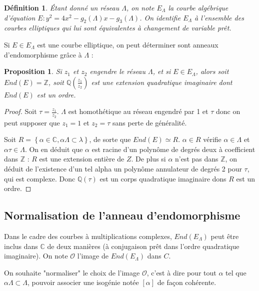 \documentclass{article}
\newcommand{\Z}[0]{\mathbb{Z}}
\newcommand{\Q}[0]{\mathbb{Q}}
\newcommand{\C}[0]{\mathbb{C}}
\newcommand{\OR}[0]{\mathcal{O}}
\newtheorem{Prop}[The]{Proposition}
\newtheorem{Def}[The]{Définition}
\begin{document}
\begin{Def}
	Étant donné un réseau $\Lambda$, on note $E_{\Lambda}$ la courbe algébrique d'équation $E : y^{2} = 4x^{2} - g_2 \left( \Lambda\right) x - g_3\left( \Lambda\right)$. On identifie $E_{\Lambda}$ à l'ensemble des courbes elliptiques qui lui sont équivalentes à changement de variable prêt. 
\end{Def}

Si $E\in E_{\Lambda}$ est une courbe elliptique, on peut déterminer sont anneaux d'endomorphisme grâce à $\Lambda$ :

\begin{Prop}
	Si $z_1$ et $z_2$ engendre le réseau $\Lambda$, et si $E\in E_{\Lambda}$, alors soit $End(E) = \Z$, soit $\Q\left( \frac{z_1}{z_2}\right)$ est une extension quadratique imaginaire dont $End(E)$ est un ordre. 
\end{Prop}

\begin{proof}
	Soit $\tau = \frac{z_1}{z_2}$. $\Lambda$ est homothétique au réseau engendré par 1 et $\tau$ donc on peut supposer que $z_1 = 1$ et $z_2 = \tau$ sans perte de généralité. 
	
	Soit $R =  \left\lbrace\alpha\in\C, \alpha\Lambda\subset\lambda\right\rbrace$, de sorte que $End(E)\simeq R$. $\alpha\in R$ vérifie $\alpha\in\Lambda$ et $\alpha\tau\in\Lambda$. On en déduit que $\alpha$ est racine d'un polynôme de degrés deux à coefficient dans $\Z$ : $R$ est une extension entière de $Z$. De plus si $\alpha$ n'est pas dans $\Z$, on déduit de l'existence d'un tel alpha un polynôme annulateur de degrés 2 pour $\tau$, qui est complexe. Donc $\Q\left(\tau\right)$ est un corps quadratique imaginaire dons $R$ est un ordre. 
\end{proof}

\subsection{Normalisation de l'anneau d'endomorphisme}


Dans le cadre des courbes à multiplications complexes, $End(E_{\Lambda})$ peut être inclus dans $\C$ de deux manières (à conjugaison prêt dans l'ordre quadratique imaginaire). On note $\OR$ l'image de $End(E_{\Lambda})$ dans $C$. 

On souhaite "normaliser" le choix de l'image $\OR$, c'est à dire pour tout $\alpha$ tel que $\alpha\Lambda\subset\Lambda$, pouvoir associer une isogénie notée $[\alpha]$ de façon cohérente.
\end{document}
